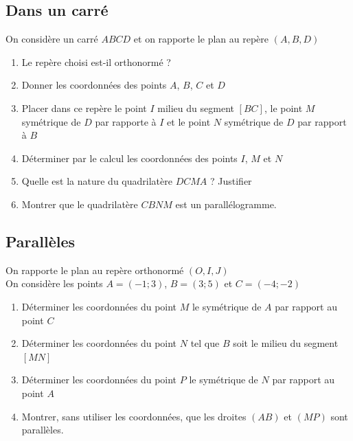 \documentclass[oneside,12pt]{article}          %
\begin{document}
\subsection{Dans un carré}
On considère un carré $ABCD$ et on rapporte le plan au repère $(A,B,D)$
\begin{enumerate}
	\item Le repère choisi est-il orthonormé ?
	\item Donner les coordonnées des points $A$, $B$, $C$ et $D$
	\item Placer dans ce repère le point $I$ milieu du segment $[BC]$, le point $M$ symétrique de $D$ par rapporte à $I$ et le point $N$ symétrique de $D$ par rapport à $B$
	\item Déterminer par le calcul les coordonnées des points $I$, $M$ et $N$
	\item Quelle est la nature du quadrilatère $DCMA$ ? Justifier
	\item Montrer que le quadrilatère $CBNM$ est un parallélogramme.
\end{enumerate}



\subsection{Parallèles}
On rapporte le plan au repère orthonormé $(O,I,J)$\\
On considère les points $A=(-1;3)$, $B=(3;5)$ et $C=(-4;-2)$
\begin{enumerate}
	\item Déterminer les coordonnées du point $M$ le symétrique de $A$ par rapport au point $C$
	\item Déterminer les coordonnées du point $N$ tel que $B$ soit le milieu du segment $[MN]$
	\item Déterminer les coordonnées du point $P$ le symétrique de $N$ par rapport au point $A$
	\item Montrer, sans utiliser les coordonnées, que les droites $(AB)$ et $(MP)$ sont parallèles.
\end{enumerate}
\end{document}

